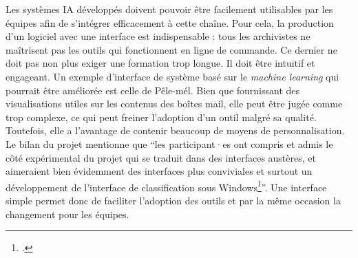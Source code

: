 Les systèmes IA développés doivent pouvoir être facilement utilisables par les équipes afin de s'intégrer
efficacement à cette chaîne. Pour cela, la production d'un logiciel avec une interface est indispensable : tous les archivistes ne maîtrisent pas les outils qui fonctionnent en ligne de commande. Ce dernier ne doit pas non plus exiger une formation trop longue. Il doit être intuitif et engageant. Un exemple d'interface de système basé sur le \emph{machine learning} qui pourrait être améliorée est celle de Pêle-mél.
Bien que fournissant des visualisations utiles sur les contenus des boîtes mail, elle peut être jugée comme trop complexe, 
ce qui peut freiner l'adoption d'un outil malgré sa qualité. Toutefois, elle a l'avantage de contenir beaucoup de moyens de personnalisation.
Le bilan du projet mentionne que \enquote{les participant·es ont compris et admis le côté expérimental du projet qui se traduit dans	des interfaces austères, et aimeraient bien évidemment des interfaces plus conviviales et
	surtout un développement de l’interface de classification sous Windows\footcite{noauthor_bilan_nodate}}. 
Une interface simple permet donc de faciliter l'adoption des outils et par la même occasion la \gls{changement} pour les équipes.


